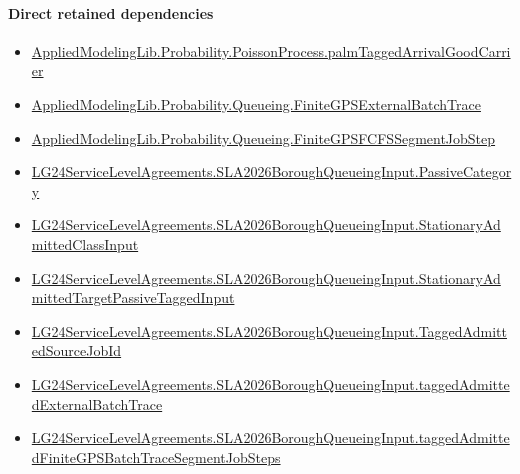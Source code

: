 \documentclass[10pt]{article}
\begin{document}
\paragraph{Direct retained dependencies}
\begin{itemize}\raggedright
\item \hyperlink{governing-declaration-ae13476c571ece6d}{Applied\allowbreak{}Modeling\allowbreak{}Lib.\allowbreak{}Probability.\allowbreak{}Poisson\allowbreak{}Process.\allowbreak{}palm\allowbreak{}Tagged\allowbreak{}Arrival\allowbreak{}Good\allowbreak{}Carrier}
\item \hyperlink{governing-declaration-e4b34708a4789d6f}{Applied\allowbreak{}Modeling\allowbreak{}Lib.\allowbreak{}Probability.\allowbreak{}Queueing.\allowbreak{}Finite\allowbreak{}GPS\allowbreak{}External\allowbreak{}Batch\allowbreak{}Trace}
\item \hyperlink{governing-declaration-8fcaf575fc5b34e1}{Applied\allowbreak{}Modeling\allowbreak{}Lib.\allowbreak{}Probability.\allowbreak{}Queueing.\allowbreak{}Finite\allowbreak{}GPSFCFS\allowbreak{}Segment\allowbreak{}Job\allowbreak{}Step}
\item \hyperlink{governing-declaration-abc91e26948cf0a3}{LG24\allowbreak{}Service\allowbreak{}Level\allowbreak{}Agreements.\allowbreak{}SLA2026\allowbreak{}Borough\allowbreak{}Queueing\allowbreak{}Input.\allowbreak{}Passive\allowbreak{}Category}
\item \hyperlink{governing-declaration-f3072ff54a3653c2}{LG24\allowbreak{}Service\allowbreak{}Level\allowbreak{}Agreements.\allowbreak{}SLA2026\allowbreak{}Borough\allowbreak{}Queueing\allowbreak{}Input.\allowbreak{}Stationary\allowbreak{}Admitted\allowbreak{}Class\allowbreak{}Input}
\item \hyperlink{governing-declaration-8796a25a610eaea9}{LG24\allowbreak{}Service\allowbreak{}Level\allowbreak{}Agreements.\allowbreak{}SLA2026\allowbreak{}Borough\allowbreak{}Queueing\allowbreak{}Input.\allowbreak{}Stationary\allowbreak{}Admitted\allowbreak{}Target\allowbreak{}Passive\allowbreak{}Tagged\allowbreak{}Input}
\item \hyperlink{governing-declaration-03f187b908407c39}{LG24\allowbreak{}Service\allowbreak{}Level\allowbreak{}Agreements.\allowbreak{}SLA2026\allowbreak{}Borough\allowbreak{}Queueing\allowbreak{}Input.\allowbreak{}Tagged\allowbreak{}Admitted\allowbreak{}Source\allowbreak{}Job\allowbreak{}Id}
\item \hyperlink{governing-declaration-db5021683b0ac329}{LG24\allowbreak{}Service\allowbreak{}Level\allowbreak{}Agreements.\allowbreak{}SLA2026\allowbreak{}Borough\allowbreak{}Queueing\allowbreak{}Input.\allowbreak{}tagged\allowbreak{}Admitted\allowbreak{}External\allowbreak{}Batch\allowbreak{}Trace}
\item \hyperlink{governing-declaration-7f482cc00e1f2eb9}{LG24\allowbreak{}Service\allowbreak{}Level\allowbreak{}Agreements.\allowbreak{}SLA2026\allowbreak{}Borough\allowbreak{}Queueing\allowbreak{}Input.\allowbreak{}tagged\allowbreak{}Admitted\allowbreak{}Finite\allowbreak{}GPS\allowbreak{}Batch\allowbreak{}Trace\allowbreak{}Segment\allowbreak{}Job\allowbreak{}Steps}
\end{itemize}
\hypertarget{governing-declaration-9809c038e0aeb676}{}
\end{document}
